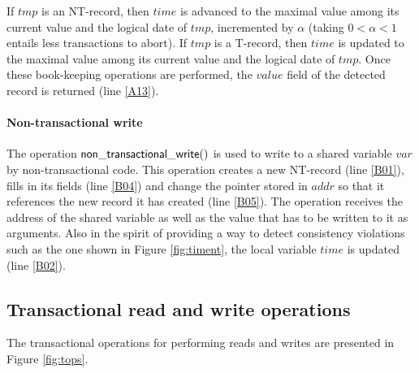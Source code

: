 \documentclass[11pt,letterpaper]{article}
\begin{document}
If $\mathit{tmp}$ is an NT-record, then $\mathit{time}$ is advanced to 
the maximal 
value among its current 
value and the logical date of $\mathit{tmp}$, incremented by $\alpha$ 
(taking  $0 < \alpha < 1$  entails less transactions to abort). 
If $\mathit{tmp}$ is a T-record, then $\mathit{time}$ is updated to the 
maximal value among its current value and the logical date of $\mathit{tmp}$.
 Once these book-keeping 
operations are performed, the $\mathit{value}$ field of the detected record 
is returned (line \ref{A13}).

\paragraph{Non-transactional write}
The operation ${\sf non\_transactional\_write()}$ is used to write to 
a shared variable $\mathit{var}$ 
by non-transactional code. This operation  
creates a  new  NT-record  (line  \ref{B01}),  fills  in  its  fields  (line
\ref{B04})  and 
change the pointer stored in $\mathit{addr}$ so that it references the 
new record it has created  (line \ref{B05}). 
The operation receives the address of the shared variable as well as the 
value that has to be written to it as arguments. Also in the spirit of 
providing a way to  detect consistency violations such as the one shown 
in Figure \ref{fig:timent}, the local 
variable $\mathit{time}$ is updated (line \ref{B02}).


\subsection{Transactional read and write operations}

The transactional operations for performing reads and writes are 
presented in Figure \ref{fig:tops}. 
\end{document}
